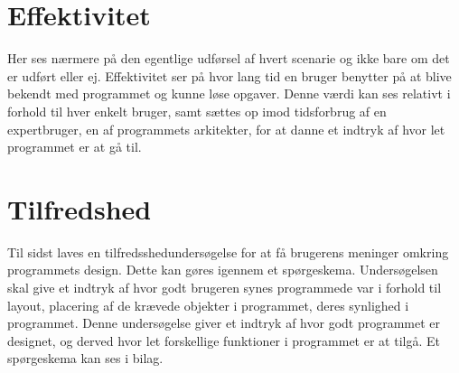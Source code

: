 \section{Effektivitet}
Her ses nærmere på den egentlige udførsel af hvert scenarie og ikke bare om det er udført eller ej. Effektivitet ser på hvor lang tid en bruger benytter på at blive bekendt med programmet og kunne løse opgaver. Denne værdi kan ses relativt i forhold til hver enkelt bruger, samt sættes op imod tidsforbrug af en expertbruger, en af programmets arkitekter, for at danne et indtryk af hvor let programmet er at gå til.
\section{Tilfredshed}
Til sidst laves en tilfredsshedundersøgelse for at få brugerens meninger omkring programmets design. Dette kan gøres igennem et spørgeskema. Undersøgelsen skal give et indtryk af hvor godt brugeren synes programmede var i forhold til layout, placering af de krævede objekter i programmet, deres synlighed i programmet. Denne undersøgelse giver et indtryk af hvor godt programmet er designet, og derved hvor let forskellige funktioner i programmet er at tilgå. Et spørgeskema kan ses i bilag. 

\cbend